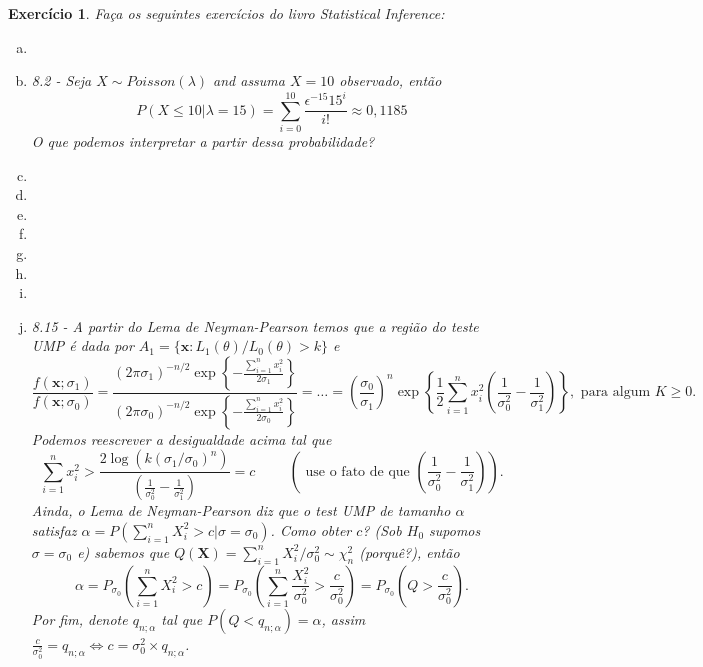 \documentclass[letter,11pt]{article}
\newtheorem{exer}{Exercício}
\begin{document}
\begin{exer} \rm
 Faça os seguintes exercícios do livro Statistical Inference: 

\begin{enumerate}[a)] 

\item %

\item 8.2 - Seja $X \sim Poisson(\lambda)$ and assuma $X=10$ observado, então 
$$P(X \leq 10 \vert \lambda = 15) = \sum_{i=0}^{10} \frac{\epsilon^{-15} 15^i}{i!} \approx 0,1185$$
O que podemos interpretar a partir dessa probabilidade?

\item %

\item %

\item %

\item %

\item %

\item %

\item %

\item 8.15 - A partir do Lema de Neyman-Pearson temos que a região do teste UMP é dada por $A_1 = \{ \boldsymbol{x}: L_1(\theta) / L_0(\theta) > k \}$ e 
$$ \frac{f(\boldsymbol{x}; \sigma_1)}{f(\boldsymbol{x}; \sigma_0)} =  \frac{ (2 \pi \sigma_1)^{-n/2} \exp 
\left\{ - \frac{\sum_{i=1}^n x_i^2}{2 \sigma_1} \right\} }{ (2 \pi \sigma_0)^{-n/2} \exp 
\left\{ - \frac{\sum_{i=1}^n x_i^2}{2 \sigma_0} \right\}  } = \ldots = \left( \frac{\sigma_0}{\sigma_1} \right)^n \exp \left\{ \frac{1}{2} \sum_{i=1}^n x_i^2  \left( \frac{1}{\sigma_0^2} - \frac{1}{ 
\sigma_1^2} \right) \right\}, \text{ para algum } K \geq 0 .$$
Podemos reescrever a desigualdade acima tal que 
$$ \sum_{i=1}^n x_i^2 > \frac{2 \log \left( k (\sigma_1 / \sigma_0)^n \right)}{\left( \frac{1}{\sigma_0^2} - 
\frac{1}{\sigma_1^2} \right)} = c \hspace{1cm} \left( \text{ use o fato de que } \left( \frac{1}{\sigma_0^2} - \frac{1}{\sigma_1^2} \right) \right).$$
Ainda, o Lema de Neyman-Pearson diz que o test UMP de tamanho $\alpha$ satisfaz 
$\alpha = P \left( \sum_{i=1}^n X_i^2 > c \vert \sigma = \sigma_0 \right)$.
Como obter $c$? (Sob $H_0$ supomos $\sigma = \sigma_0$ e) sabemos que $Q(\boldsymbol{X}) = \sum_{i=1}^n X_i^2 / \sigma_0^2 
\sim \chi^2_n$ (porquê?), então
$$\alpha = P_{\sigma_0} \left( \sum_{i=1}^n X_i^2 >  c \right) = P_{\sigma_0} \left( \sum_{i=1}^n \frac{ 
X_i^2 }{\sigma_0^2} >  \frac{ c }{\sigma_0^2} \right) = P_{\sigma_0} \left( Q >  \frac{ c }{\sigma_0^2} \right).$$
Por fim, denote $q_{n; \alpha}$ tal que $P(Q < q_{n; \alpha}) = \alpha$, assim $\frac{c}{\sigma^2_0} = q_{n; \alpha} \Leftrightarrow c = \sigma^2_0 \times q_{n; \alpha}$.


\end{enumerate}
\end{exer}
\end{document}
